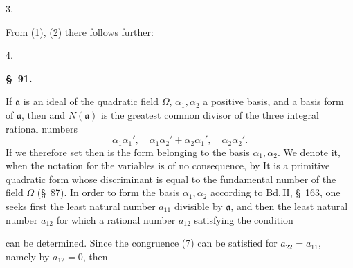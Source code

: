 
3. 

From (1), (2) there follows further:

4. 

\textbf{\S\ 91. }

If $\mathfrak{a}$ is an ideal of the quadratic field $\Omega$, $\alpha_1, \alpha_2$ a
positive basis, and
a basis form of $\mathfrak{a}$, then
and $N(\mathfrak{a})$ is the greatest common divisor of the three integral
rational numbers
\[
\alpha_1\alpha_1', \quad \alpha_1\alpha_2'+\alpha_2\alpha_1', \quad \alpha_2\alpha_2'.
\]
If we therefore set
then
is the form belonging to the basis $\alpha_1, \alpha_2$. We denote it, when
the notation for the variables is of no consequence, by
It is a primitive quadratic form whose discriminant
is equal to the fundamental number of the field $\Omega$ (\S\ 87). In order to form
the basis $\alpha_1, \alpha_2$ according to Bd.\,II, \S\ 163, one seeks first the least
natural number $a_{11}$ divisible by $\mathfrak{a}$, and then the least
natural number $a_{12}$ for which a rational number $a_{12}$ satisfying the condition %

can be determined. Since the congruence (7) can be satisfied for
$a_{22}=a_{11}$, namely by $a_{12}=0$, then
